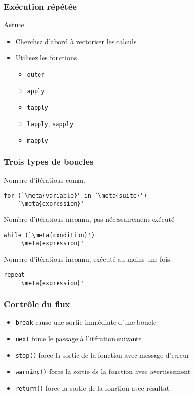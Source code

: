 \begin{frame}
  \frametitle{Exécution répétée}

  \begin{alertblock}{Astuce}
    \begin{itemize}
    \item Cherchez d'abord à vectoriser les calculs
    \item Utilisez les fonctions
      \begin{itemize}
      \item \texttt{outer}
      \item \texttt{apply}
      \item \texttt{tapply}
      \item \texttt{lapply}, \texttt{sapply}
      \item \texttt{mapply}
      \end{itemize}
    \end{itemize}
  \end{alertblock}
\end{frame}

\begin{frame}[fragile=singleslide]
  \frametitle{Trois types de boucles}

  Nombre d'itérations connu.
  \begin{Schunk}
\begin{lstlisting}
for (`\meta{variable}' in `\meta{suite}')
    `\meta{expression}'
\end{lstlisting}
  \end{Schunk}

  Nombre d'itérations inconnu, pas nécessairement exécuté.
  \begin{Schunk}
\begin{lstlisting}
while (`\meta{condition}')
    `\meta{expression}'
\end{lstlisting}
  \end{Schunk}

  Nombre d'itérations inconnu, exécuté au moins une fois.
  \begin{Schunk}
\begin{lstlisting}
repeat
    `\meta{expression}'
\end{lstlisting}
  \end{Schunk}
\end{frame}

\begin{frame}
  \frametitle{Contrôle du flux}

  \begin{itemize}
  \item \texttt{break} cause une sortie immédiate d'une boucle
  \item \texttt{next} force le passage à l'itération suivante
  \item \texttt{stop()} force la sortie de la fonction avec message
    d'erreur
  \item \texttt{warning()} force la sortie de la fonction avec
    avertissement
  \item \texttt{return()} force la sortie de la fonction avec résultat
  \end{itemize}

  \pause
\end{frame}

